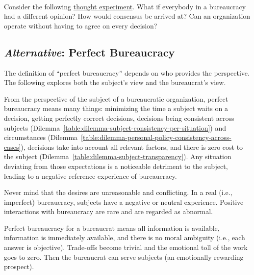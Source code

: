 \ \\

Consider the following 
\href{https://en.wikipedia.org/wiki/Thought_experiment}{thought experiment}. 
\iftoggle{WPinmargin}{\marginpar{$>$Wikipedia: thought experiment}}{}
What if everybody in a bureaucracy had a different opinion? How would consensus be arrived at? 
Can an organization operate without having to agree on every decision? 



\subsection*{\textit{Alternative}: Perfect Bureaucracy}

The definition of ``perfect bureaucracy'' depends on who provides the perspective. The following explores both the subject's view and the bureaucrat's view. 

From the perspective of the subject of a bureaucratic organization, perfect bureaucracy means many things: minimizing the time a subject waits on a decision, getting perfectly correct decisions, decisions being consistent across subjects (Dilemma~\ref{table:dilemma-subject-consistency-per-situation})
%
and circumstances (Dilemma~\ref{table:dilemma-personal-policy-consistency-across-cases}), decisions take into account all relevant factors, and there is zero cost to the subject (Dilemma~\ref{table:dilemma-subject-transparency}). 
%
Any situation deviating from those expectations is a noticeable detriment to the subject, leading to a negative reference experience of bureaucracy. 

Never mind that the desires are unreasonable and conflicting. In a real (i.e., imperfect) bureaucracy, subjects have a negative or neutral experience. Positive interactions with bureaucracy are rare and are regarded as abnormal.

Perfect bureaucracy for a bureaucrat means all information is available, information is immediately available, and there is no moral ambiguity (i.e., each answer is objective). Trade-offs become trivial and the emotional toll of the work goes to zero. Then the bureaucrat can serve subjects (an emotionally rewarding prospect). 

